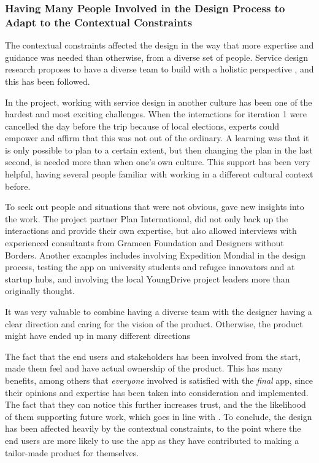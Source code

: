   \subsubsection{Having Many People Involved in the Design Process to Adapt to the Contextual Constraints}

  The contextual constraints affected the design in the way that more expertise and guidance was needed than otherwise, from a diverse set of people. Service design research proposes to have a diverse team to build with a holistic perspective \citep{stickdorn}, and this has been followed.

  In the project, working with service design in another culture has been one of the hardest and most exciting challenges. When the interactions for iteration 1 were cancelled the day before the trip because of local elections, experts could empower and affirm that this was not out of the ordinary. A learning was that it is only possible to plan to a certain extent, but then changing the plan in the last second, is needed more than when one's own culture. This support has been very helpful, having several people familiar with working in a different cultural context before.


  To seek out people and situations that were not obvious, gave new insights into the work.  The project partner Plan International, did not only back up the interactions and provide their own expertise, but also allowed interviews with experienced consultants from Grameen Foundation and Designers without Borders. Another examples includes involving Expedition Mondial in the design process, testing the app on university students and refugee innovators and at startup hubs, and involving the local YoungDrive project leaders more than originally thought.

  It was very valuable to combine having a diverse team with the designer having a clear direction and caring for the vision of the product. Otherwise, the product might have ended up in many different directions

  The fact that the end users and stakeholders has been involved from the start, made them feel and have actual ownership of the product. This has many benefits, among others that \textit{everyone} involved is satisfied with the \textit{final} app, since their opinions and expertise has been taken into consideration and implemented. The fact that they can notice this further increases trust, and the the likelihood of them supporting future work, which goes in line with \cite{stickdorn}. To conclude, the design has been affected heavily by the contextual constraints, to the point where the end users are more likely to use the app as they have contributed to making a tailor-made product for themselves.

